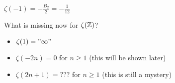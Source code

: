 \begin{example}
$\zeta(-1) = - \frac{B_{2}}{2} = - \frac{1}{12}$
\end{example}

What is missing now for $\zeta(\mathbb{Z})$?

\begin{itemize}
    \item $\zeta(1) = "\infty"$
    \item $\zeta(-2n) = 0$ for $n \geq 1$ (this will be shown later)
    \item $\zeta(2n+1) = ???$ for $n \geq 1$ (this is still a mystery)
\end{itemize}
